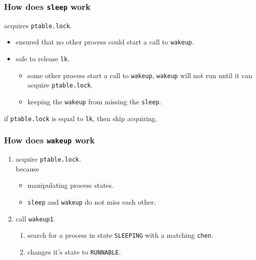 \documentclass{beamer}
\begin{document}
\begin{frame}[t]
  \frametitle{How does \texttt{sleep} work}

  acquires \texttt{ptable.lock}.
  \begin{itemize}
  \item ensured that no other process could start a call to \texttt{wakeup}.
  \item safe to release \texttt{lk}.
    \begin{itemize}
    \item some other process start a call to \texttt{wakeup}, \texttt{wakeup} will not
      run until it can acquire \texttt{ptable.lock}.
    \item keeping the \texttt{wakeup} from missing the \texttt{sleep}.
    \end{itemize}
  \end{itemize}

  \begin{center}
    if \texttt{ptable.lock} is equal to \texttt{lk}, then skip acquiring.
  \end{center}
  
\end{frame}


\begin{frame}[t]
  \frametitle{How does \texttt{wakeup} work}
  \begin{enumerate}
  \item acquire \texttt{ptable.lock}.\\
    because
    \begin{itemize}
    \item manipulating process states.
    \item \texttt{sleep} and \texttt{wakeup} do not miss each other.
    \end{itemize}
  \item call \texttt{wakeup1}.
    \begin{enumerate}
    \item search for a process in state \texttt{SLEEPING} with a matching \texttt{chen}.
    \item changes it's state to \texttt{RUNNABLE}.
    \end{enumerate}
  \end{enumerate}
  
\end{frame}

\end{document}
